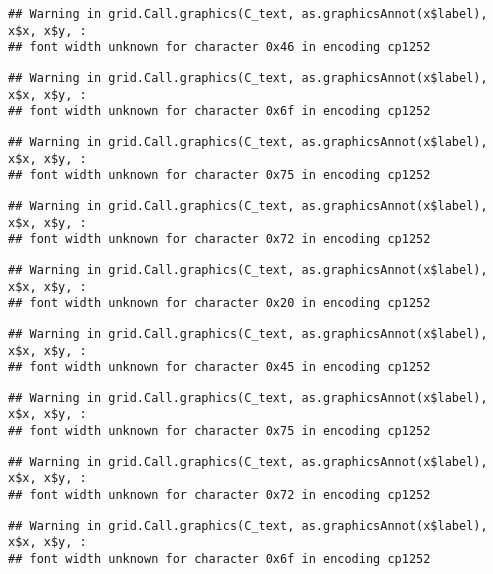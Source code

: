 \documentclass[
]{article}
\begin{document}
\begin{verbatim}
## Warning in grid.Call.graphics(C_text, as.graphicsAnnot(x$label), x$x, x$y, :
## font width unknown for character 0x46 in encoding cp1252
\end{verbatim}

\begin{verbatim}
## Warning in grid.Call.graphics(C_text, as.graphicsAnnot(x$label), x$x, x$y, :
## font width unknown for character 0x6f in encoding cp1252
\end{verbatim}

\begin{verbatim}
## Warning in grid.Call.graphics(C_text, as.graphicsAnnot(x$label), x$x, x$y, :
## font width unknown for character 0x75 in encoding cp1252
\end{verbatim}

\begin{verbatim}
## Warning in grid.Call.graphics(C_text, as.graphicsAnnot(x$label), x$x, x$y, :
## font width unknown for character 0x72 in encoding cp1252
\end{verbatim}

\begin{verbatim}
## Warning in grid.Call.graphics(C_text, as.graphicsAnnot(x$label), x$x, x$y, :
## font width unknown for character 0x20 in encoding cp1252
\end{verbatim}

\begin{verbatim}
## Warning in grid.Call.graphics(C_text, as.graphicsAnnot(x$label), x$x, x$y, :
## font width unknown for character 0x45 in encoding cp1252
\end{verbatim}

\begin{verbatim}
## Warning in grid.Call.graphics(C_text, as.graphicsAnnot(x$label), x$x, x$y, :
## font width unknown for character 0x75 in encoding cp1252
\end{verbatim}

\begin{verbatim}
## Warning in grid.Call.graphics(C_text, as.graphicsAnnot(x$label), x$x, x$y, :
## font width unknown for character 0x72 in encoding cp1252
\end{verbatim}

\begin{verbatim}
## Warning in grid.Call.graphics(C_text, as.graphicsAnnot(x$label), x$x, x$y, :
## font width unknown for character 0x6f in encoding cp1252
\end{verbatim}
\end{document}
